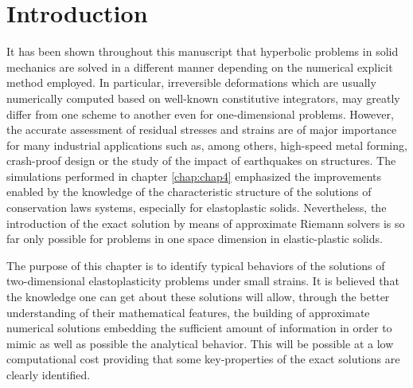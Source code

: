 
\section*{Introduction}
It has been shown throughout this manuscript that hyperbolic problems in solid mechanics are solved in a different manner depending on the numerical explicit method employed. 
In particular, irreversible deformations which are usually numerically computed based on well-known constitutive integrators, may greatly differ from one scheme to another even for one-dimensional problems.
However, the accurate assessment of residual stresses and strains are of major importance for many industrial applications such as, among others, high-speed metal forming, crash-proof design or the study of the impact of earthquakes on structures.
The simulations performed in chapter \ref{chap:chap4} emphasized the improvements enabled by the knowledge of the characteristic structure of the solutions of conservation laws systems, especially for elastoplastic solids.
Nevertheless, the introduction of the exact solution by means of approximate Riemann solvers is so far only possible for problems in one space dimension in elastic-plastic solids.

The purpose of this chapter is to identify typical behaviors of the solutions of two-dimensional elastoplasticity problems under small strains.
It is believed that the knowledge one can get about these solutions will allow, through the better understanding of their mathematical features, the building of approximate numerical solutions embedding the sufficient amount of information in order to mimic as well as possible the analytical behavior.
This will be possible at a low computational cost providing that some key-properties of the exact solutions are clearly identified. 

